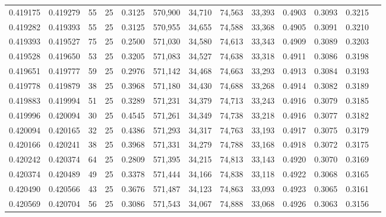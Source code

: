 \begin{tabular}{rrrrrrrrrrrrr}
0.419175 & 0.419279 &    55 &  25 &                                     0.3125 & 570,900 &  34,710 &  74,563 &  33,393 & 0.4903 & 0.3093 & 0.3215 \\
0.419282 & 0.419393 &    55 &  25 &                                     0.3125 & 570,955 &  34,655 &  74,588 &  33,368 & 0.4905 & 0.3091 & 0.3210 \\
0.419393 & 0.419527 &    75 &  25 &                                     0.2500 & 571,030 &  34,580 &  74,613 &  33,343 & 0.4909 & 0.3089 & 0.3203 \\
0.419528 & 0.419650 &    53 &  25 &                                     0.3205 & 571,083 &  34,527 &  74,638 &  33,318 & 0.4911 & 0.3086 & 0.3198 \\
0.419651 & 0.419777 &    59 &  25 &                                     0.2976 & 571,142 &  34,468 &  74,663 &  33,293 & 0.4913 & 0.3084 & 0.3193 \\
0.419778 & 0.419879 &    38 &  25 &                                     0.3968 & 571,180 &  34,430 &  74,688 &  33,268 & 0.4914 & 0.3082 & 0.3189 \\
0.419883 & 0.419994 &    51 &  25 &                                     0.3289 & 571,231 &  34,379 &  74,713 &  33,243 & 0.4916 & 0.3079 & 0.3185 \\
0.419996 & 0.420094 &    30 &  25 &                                     0.4545 & 571,261 &  34,349 &  74,738 &  33,218 & 0.4916 & 0.3077 & 0.3182 \\
0.420094 & 0.420165 &    32 &  25 &                                     0.4386 & 571,293 &  34,317 &  74,763 &  33,193 & 0.4917 & 0.3075 & 0.3179 \\
0.420166 & 0.420241 &    38 &  25 &                                     0.3968 & 571,331 &  34,279 &  74,788 &  33,168 & 0.4918 & 0.3072 & 0.3175 \\
0.420242 & 0.420374 &    64 &  25 &                                     0.2809 & 571,395 &  34,215 &  74,813 &  33,143 & 0.4920 & 0.3070 & 0.3169 \\
0.420374 & 0.420489 &    49 &  25 &                                     0.3378 & 571,444 &  34,166 &  74,838 &  33,118 & 0.4922 & 0.3068 & 0.3165 \\
0.420490 & 0.420566 &    43 &  25 &                                     0.3676 & 571,487 &  34,123 &  74,863 &  33,093 & 0.4923 & 0.3065 & 0.3161 \\
0.420569 & 0.420704 &    56 &  25 &                                     0.3086 & 571,543 &  34,067 &  74,888 &  33,068 & 0.4926 & 0.3063 & 0.3156 \\

\end{tabular}
